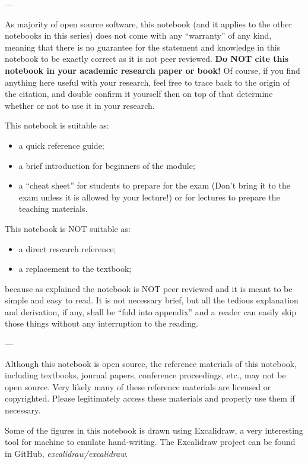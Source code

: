 \noindent ---

\noindent As majority of open source software, this notebook (and it applies to the other notebooks in this series) does not come with any ``warranty'' of any kind, meaning that there is no guarantee for the statement and knowledge in this notebook to be exactly correct as it is not peer reviewed. \textbf{Do NOT cite this notebook in your academic research paper or book!} Of course, if you find anything here useful with your research, feel free to trace back to the origin of the citation, and double confirm it yourself then on top of that determine whether or not to use it in your research.

This notebook is suitable as:
\begin{itemize}
  \item a quick reference guide;
  \item a brief introduction for beginners of the module;
  \item a ``cheat sheet'' for students to prepare for the exam (Don't bring it to the exam unless it is allowed by your lecture!) or for lectures to prepare the teaching materials.
\end{itemize}

This notebook is NOT suitable as:
\begin{itemize}
  \item a direct research reference;
  \item a replacement to the textbook;
\end{itemize}
because as explained the notebook is NOT peer reviewed and it is meant to be simple and easy to read. It is not necessary brief, but all the tedious explanation and derivation, if any, shall be ``fold into appendix'' and a reader can easily skip those things without any interruption to the reading.

\noindent ---

Although this notebook is open source, the reference materials of this notebook, including textbooks, journal papers, conference proceedings, etc., may not be open source. Very likely many of these reference materials are licensed or copyrighted. Please legitimately access these materials and properly use them if necessary.

Some of the figures in this notebook is drawn using Excalidraw, a very interesting tool for machine to emulate hand-writing. The Excalidraw project can be found in GitHub, \textit{excalidraw/excalidraw}.
